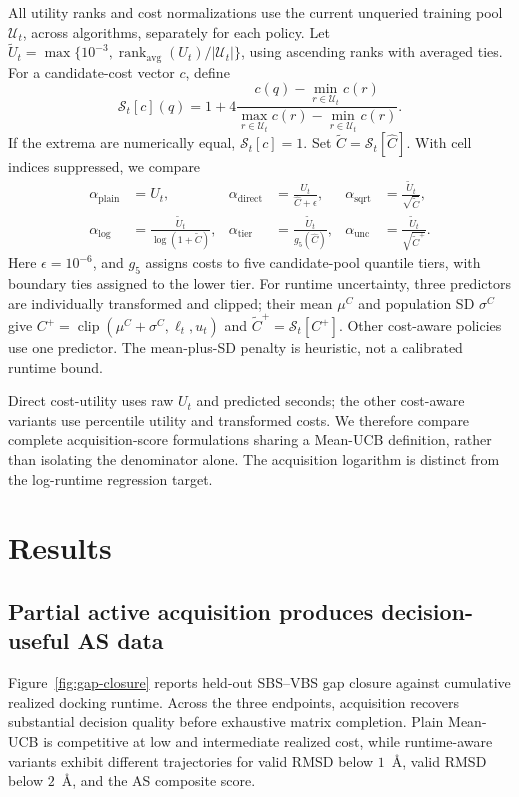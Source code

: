 \documentclass{article}
\begin{document}
All utility ranks and cost normalizations use the current unqueried training pool $\mathcal U_t$, across algorithms, separately for each policy. Let $\widetilde U_t=\max\{10^{-3},\operatorname{rank}_{\mathrm{avg}}(U_t)/|\mathcal U_t|\}$, using ascending ranks with averaged ties. For a candidate-cost vector $c$, define
\begin{equation}
\mathcal S_t[c](q)=1+4\frac{c(q)-\min_{r\in\mathcal U_t}c(r)}
{\max_{r\in\mathcal U_t}c(r)-\min_{r\in\mathcal U_t}c(r)}.
\end{equation}
If the extrema are numerically equal, $\mathcal S_t[c]=1$. Set $\widetilde C=\mathcal S_t[\widehat C]$. With cell indices suppressed, we compare
\begin{align}
\alpha_{\mathrm{plain}}&=U_t,
&
\alpha_{\mathrm{direct}}&=\frac{U_t}{\widehat C+\epsilon},
&
\alpha_{\mathrm{sqrt}}&=\frac{\widetilde U_t}{\sqrt{\widetilde C}},
\nonumber\\
\alpha_{\mathrm{log}}&=\frac{\widetilde U_t}{\log(1+\widetilde C)},
&
\alpha_{\mathrm{tier}}&=\frac{\widetilde U_t}{g_5(\widehat C)},
&
\alpha_{\mathrm{unc}}&=\frac{\widetilde U_t}{\sqrt{\widetilde C^+}}.
\end{align}
Here $\epsilon=10^{-6}$, and $g_5$ assigns costs to five candidate-pool quantile tiers, with boundary ties assigned to the lower tier. For runtime uncertainty, three predictors are individually transformed and clipped; their mean $\mu^C$ and population SD $\sigma^C$ give $C^+=\operatorname{clip}(\mu^C+\sigma^C,\ell_t,u_t)$ and $\widetilde C^+=\mathcal S_t[C^+]$. Other cost-aware policies use one predictor. The mean-plus-SD penalty is heuristic, not a calibrated runtime bound.

Direct cost-utility uses raw $U_t$ and predicted seconds; the other cost-aware variants use percentile utility and transformed costs. We therefore compare complete acquisition-score formulations sharing a Mean-UCB definition, rather than isolating the denominator alone. The acquisition logarithm is distinct from the log-runtime regression target.

\section{Results}
\subsection{Partial active acquisition produces decision-useful AS data}
Figure~\ref{fig:gap-closure} reports held-out SBS--VBS gap closure against cumulative realized docking runtime. Across the three endpoints, acquisition recovers substantial decision quality before exhaustive matrix completion. Plain Mean-UCB is competitive at low and intermediate realized cost, while runtime-aware variants exhibit different trajectories for valid RMSD below $1$~\AA, valid RMSD below $2$~\AA, and the AS composite score.
\end{document}
